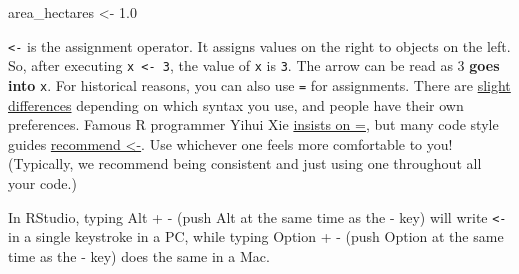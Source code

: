 \documentclass[]{book}
\newenvironment{Shaded}{\begin{snugshade}}{\end{snugshade}}
\newcommand{\FloatTok}[1]{\textcolor[rgb]{0.00,0.00,0.81}{#1}}
\newcommand{\StringTok}[1]{\textcolor[rgb]{0.31,0.60,0.02}{#1}}
\newcommand{\NormalTok}[1]{#1}
\begin{document}
\begin{Shaded}
\begin{Highlighting}[]
\NormalTok{area_hectares <-}\StringTok{ }\FloatTok{1.0}
\end{Highlighting}
\end{Shaded}

\texttt{\textless{}-} is the assignment operator. It assigns values on
the right to objects on the left. So, after executing
\texttt{x\ \textless{}-\ 3}, the value of \texttt{x} is \texttt{3}. The
arrow can be read as 3 \textbf{goes into} \texttt{x}. For historical
reasons, you can also use \texttt{=} for assignments. There are
\href{http://blog.revolutionanalytics.com/2008/12/use-equals-or-arrow-for-assignment.html}{slight}
\href{http://r.789695.n4.nabble.com/Is-there-any-difference-between-and-tp878594p878598.html}{differences}
depending on which syntax you use, and people have their own
preferences. Famous R programmer Yihui Xie
\href{https://yihui.org/en/2014/07/a-few-notes-on-user2014/}{insists on
=}, but many code style guides
\href{https://style.tidyverse.org/syntax.html\#assignment}{recommend
\textless{}-}. Use whichever one feels more comfortable to you!
(Typically, we recommend being consistent and just using one throughout
all your code.)

In RStudio, typing Alt + - (push Alt at the same time as the - key) will
write \texttt{\textless{}-} in a single keystroke in a PC, while typing
Option + - (push Option at the same time as the - key) does the same in
a Mac.
\end{document}
